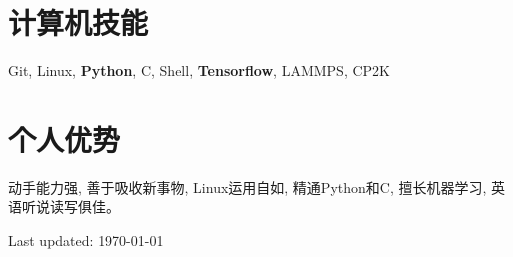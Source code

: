 \documentclass[a4paper,10pt]{article} %
\begin{document}
\section{计算机技能}
\begin{small}
Git, Linux, \textbf{Python}, C, Shell, \textbf{Tensorflow}, LAMMPS, CP2K
\end{small}


\section{个人优势}
动手能力强, 善于吸收新事物, Linux运用自如, 精通Python和C, 擅长机器学习, 英语听说读写俱佳。



\begin{flushright} 
Last updated: {\today}
\end{flushright}
\end{document}

